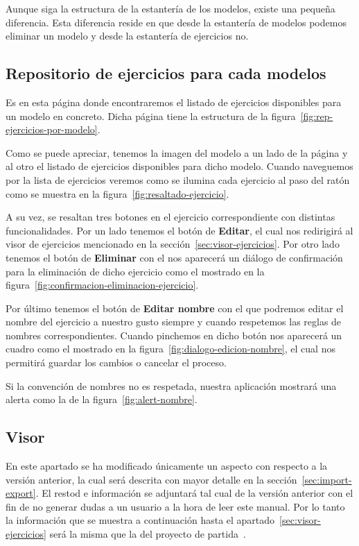 Aunque siga la estructura de la estantería de los modelos, existe una pequeña diferencia. Esta diferencia reside en que desde la estantería de modelos podemos eliminar un modelo y desde la estantería de ejercicios no.

\subsection{Repositorio de ejercicios para cada modelos}\label{sec:rep-ejercicios-modelos}
Es en esta página donde encontraremos el listado de ejercicios disponibles para un modelo en concreto. Dicha página tiene la estructura de la figura~\ref{fig:rep-ejercicios-por-modelo}.

Como se puede apreciar, tenemos la imagen del modelo a un lado de la página y al otro el listado de ejercicios disponibles para dicho modelo. Cuando naveguemos por la lista de ejercicios veremos como se ilumina cada ejercicio al paso del ratón como se muestra en la figura~\ref{fig:resaltado-ejercicio}.

A su vez, se resaltan tres botones en el ejercicio correspondiente con distintas funcionalidades. Por un lado tenemos el botón de \textbf{Editar}, el cual nos redirigirá al visor de ejercicios mencionado en la sección~\ref{sec:visor-ejercicios}. Por otro lado tenemos el botón de \textbf{Eliminar} con el nos aparecerá un diálogo de confirmación para la eliminación de dicho ejercicio como el mostrado en la figura~\ref{fig:confirmacion-eliminacion-ejercicio}.

Por último tenemos el botón de \textbf{Editar nombre} con el que podremos editar el nombre del ejercicio a nuestro gusto siempre y cuando respetemos las reglas de nombres correspondientes. Cuando pinchemos en dicho botón nos aparecerá un cuadro como el mostrado en la figura~\ref{fig:dialogo-edicion-nombre}, el cual nos permitirá guardar los cambios o cancelar el proceso.

Si la convención de nombres no es respetada, nuestra aplicación mostrará una alerta como la de la figura~\ref{fig:alert-nombre}.

\subsection{Visor}\label{sec:visor}
En este apartado se ha modificado únicamente un aspecto con respecto a la versión anterior, la cual será descrita con mayor detalle en la sección~\ref{sec:import-export}. El restod e información se adjuntará tal cual de la versión anterior con el fin de no generar dudas a un usuario a la hora de leer este manual. Por lo tanto la información que se muestra a continuación hasta el apartado~\ref{sec:visor-ejercicios} será la misma que la del proyecto de partida~\cite{github:alberto-viewer}.

